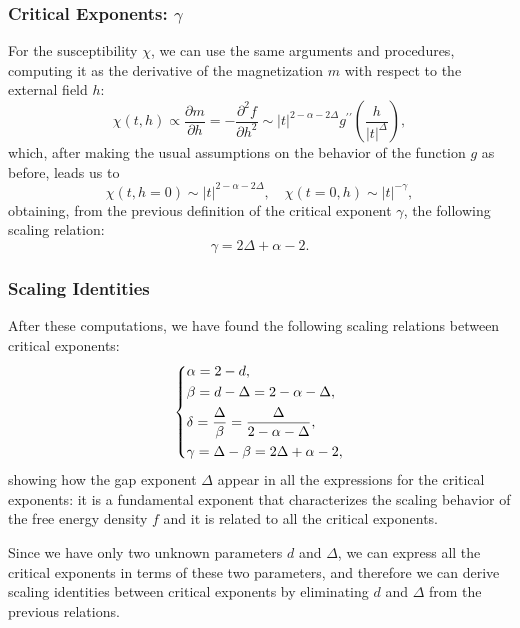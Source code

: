 \subsubsection{Critical Exponents: \(\gamma\)}

For the susceptibility \(\chi\), we can use the same arguments and procedures, computing it as the derivative of the magnetization \(m\) with respect to the external field \(h\):
\[
    \chi(t,h) \propto \frac{\partial m}{\partial h} = - \frac{\partial^2 f}{\partial h^2} \sim \vert t \vert^{2-\alpha-2\Delta} g^{\prime \prime}\left(\frac{h}{\vert t \vert^{\Delta}}\right),
\]
which, after making the usual assumptions on the behavior of the function \(g\) as before, leads us to
\[
    \chi(t,h=0) \sim \vert t \vert^{2-\alpha-2\Delta}, \quad \chi(t=0,h) \sim \vert t \vert^{-\gamma},
\]
obtaining, from the previous definition of the critical exponent \(\gamma\), the following scaling relation:
\[
    \gamma = 2\Delta + \alpha - 2.
\]

\subsubsection{Scaling Identities}

After these computations, we have found the following scaling relations between critical exponents:
\[
    \begin{dcases}
        \alpha = 2 - d,                                                 \\
        \beta = d - \Delta = 2 - \alpha - \Delta,                       \\
        \delta = \frac{\Delta}{\beta} = \frac{\Delta}{2-\alpha-\Delta}, \\
        \gamma = \Delta - \beta = 2\Delta + \alpha - 2,
    \end{dcases}
\]
showing how the gap exponent \(\Delta\) appear in all the expressions for the critical exponents: it is a fundamental exponent that characterizes the scaling behavior of the free energy density \(f\) and it is related to all the critical exponents.

Since we have only two unknown parameters \(d\) and \(\Delta\), we can express all the critical exponents in terms of these two parameters, and therefore we can derive scaling identities between critical exponents by eliminating \(d\) and \(\Delta\) from the previous relations.

